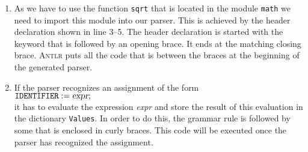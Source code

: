 \begin{enumerate}
\item As we have to use the function \texttt{sqrt} that is located in the module \texttt{math}
      we need to import this module into our parser.
      This is achieved by the header declaration shown in line 3--5.  The header declaration
      is started with the keyword \texttt{\@header} that is followed by an opening brace.
      It ends at the matching closing brace.
      \textsc{Antlr} puts all the code that is between the braces at the beginning of the generated parser. 
\item If the parser recognizes an assignment of the form
      \\[0.2cm]
      \hspace*{1.3cm}
      $\texttt{IDENTIFIER} \;\mathtt{:=}\; \textsl{expr} \mathtt{;}$
      \\[0.2cm]
      it has to evaluate the expression \textsl{expr} and store the result of this evaluation in
      the dictionary \texttt{Values}.  In order to do this, the grammar rule is followed by some
       that is enclosed in curly braces.  This code will be executed once the parser has 
      recognized the assignment.


\end{enumerate}
